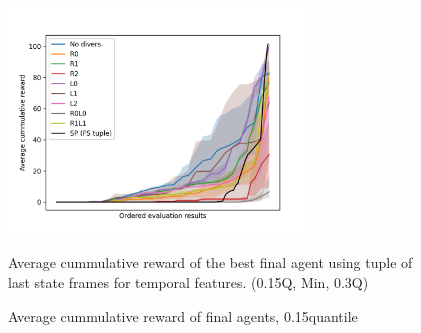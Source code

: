 \begin{figure}[!ht]
    \centering
    \includegraphics*[width=8cm]{../img/CounterCircuitFSTupleOrderedQ15.png}

    \caption{Average cummulative reward of final agents, 0.15quantile}
    \label{CounterCircuitFSTupleOrderedQ15}
    \medskip
    \small 
    Average cummulative reward of the best final agent using tuple of last state frames for temporal features.
    (0.15Q, Min, 0.3Q)

\end{figure}









